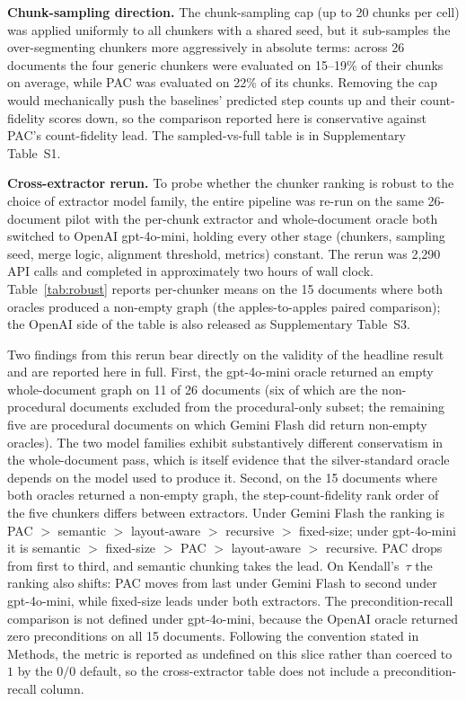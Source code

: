 \documentclass[fleqn,10pt]{wlscirep}
\begin{document}
\textbf{Chunk-sampling direction.} The chunk-sampling cap (up to 20
chunks per cell) was applied uniformly to all chunkers with a shared
seed, but it sub-samples the over-segmenting chunkers more
aggressively in absolute terms: across 26 documents the four generic
chunkers were evaluated on 15--19\% of their chunks on average,
while PAC was evaluated on 22\% of its chunks. Removing the cap would
mechanically push the baselines' predicted step counts up and their
count-fidelity scores down, so the comparison reported here is
conservative against PAC's count-fidelity lead. The sampled-vs-full
table is in Supplementary Table~S1.

\textbf{Cross-extractor rerun.} To probe whether the chunker ranking
is robust to the choice of extractor model family, the entire pipeline
was re-run on the same 26-document pilot with the per-chunk extractor
and whole-document oracle both switched to OpenAI gpt-4o-mini, holding
every other stage (chunkers, sampling seed, merge logic, alignment
threshold, metrics) constant. The rerun was 2,290 API calls and completed in approximately
two hours of wall clock. Table~\ref{tab:robust} reports per-chunker
means on the 15 documents where both oracles produced a non-empty
graph (the apples-to-apples paired comparison); the OpenAI side of the
table is also released as Supplementary Table~S3.

Two findings from this rerun bear directly on the validity of the
headline result and are reported here in full. First, the gpt-4o-mini
oracle returned an empty whole-document graph on 11 of 26 documents
(six of which are the non-procedural documents excluded from the
procedural-only subset; the remaining five are procedural documents on
which Gemini Flash did return non-empty oracles). The two model
families exhibit substantively different conservatism in the
whole-document pass, which is itself evidence that the silver-standard
oracle depends on the model used to produce it. Second, on the 15
documents where both oracles returned a non-empty graph, the
step-count-fidelity rank order of the five chunkers differs between
extractors. Under Gemini Flash the ranking is PAC $>$ semantic $>$
layout-aware $>$ recursive $>$ fixed-size; under gpt-4o-mini it is
semantic $>$ fixed-size $>$ PAC $>$ layout-aware $>$ recursive.
PAC drops from first to third, and semantic chunking takes the lead.
On Kendall's~$\tau$ the ranking also shifts: PAC moves from last
under Gemini Flash to second under gpt-4o-mini, while fixed-size leads
under both extractors. The precondition-recall comparison is
not defined under gpt-4o-mini, because the OpenAI oracle returned
zero preconditions on all 15 documents. Following the convention
stated in Methods, the metric is reported as undefined on this slice
rather than coerced to $1$ by the $0/0$ default, so the cross-extractor
table does not include a precondition-recall column.
\end{document}
